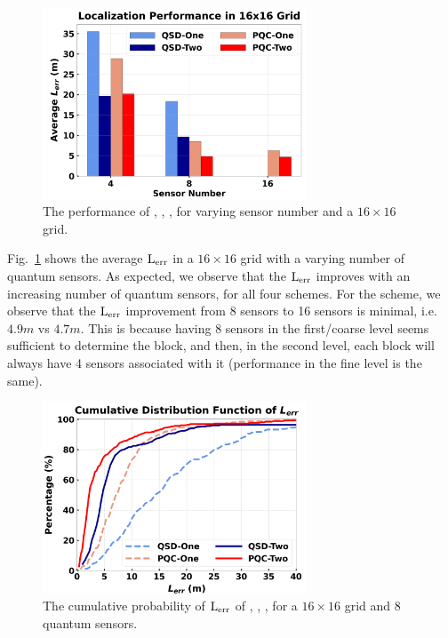 \begin{figure}[ht]
    \centering
    \includegraphics[width=0.7\textwidth]{chapters/qce/figures/continuous.varysensornum.png}
    \caption{The performance of \povmone, \povm, \pqcone, \pqctwo for varying sensor number and a $16\times16$ grid.}
    \label{fig:continuous.varysen}
\end{figure}

Fig.~\ref{fig:continuous.varysen} shows the average $\mathrm{L_{err}}$ in a $16\times16$ grid with a varying number of quantum sensors.
As expected, we observe that the $\mathrm{L_{err}}$ improves with an increasing number of quantum sensors,
for all four schemes.
For the \pqctwo scheme, we observe that the $\mathrm{L_{err}}$ improvement from 8 sensors to 16 sensors is minimal, i.e. $4.9 m$ vs $4.7 m$. 
This is because having 8 sensors in the first/coarse level seems sufficient to determine the block,
and then, in the second level, each block will always have 4 sensors associated with it (performance in the fine level is the same). 

\begin{figure}[ht]
    \centering
    \includegraphics[width=0.7\textwidth]{chapters/qce/figures/error_cdf.png}
    \caption{The cumulative probability of $\mathrm{L_{err}}$ of \povmone, \povm, \pqcone, \pqctwo for a $16\times16$ grid and 8 quantum sensors.}
    \label{fig:continuous.errorcdf}
\end{figure}


